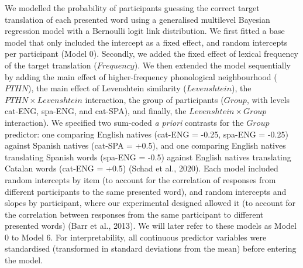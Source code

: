 \documentclass[
  english,
  man,floatsintext]{apa7}
\begin{document}
We modelled the probability of participants guessing the correct target translation of each presented word using a generalised multilevel Bayesian regression model with a Bernoulli logit link distribution. We first fitted a base model that only included the intercept as a fixed effect, and random intercepts per participant (Model 0). Secondly, we added the fixed effect of lexical frequency of the target translation (\(Frequency\)). We then extended the model sequentially by adding the main effect of higher-frequency phonological neighbourhood (\(PTHN\)), the main effect of Levenshtein similarity (\(Levenshtein\)), the \(PTHN \times Levenshtein\) interaction, the group of participants (\(Group\), with levels cat-ENG, spa-ENG, and cat-SPA), and finally, the \(Levenshtein \times Group\) interaction). We specified two sum-coded \emph{a priori} contrasts for the \(Group\) predictor: one comparing English natives (cat-ENG = -0.25, spa-ENG = -0.25) against Spanish natives (cat-SPA = +0.5), and one comparing English natives translating Spanish words (spa-ENG = -0.5) against English natives translating Catalan words (cat-ENG = +0.5) (Schad et al., 2020). Each model included random intercepts by item (to account for the correlation of responses from different participants to the same presented word), and random intercepts and slopes by participant, where our experimental designed allowed it (to account for the correlation between responses from the same participant to different presented words) (Barr et al., 2013). We will later refer to these models as Model 0 to Model 6. For interpretability, all continuous predictor variables were standardised (transformed in standard deviations from the mean) before entering the model.
\end{document}
